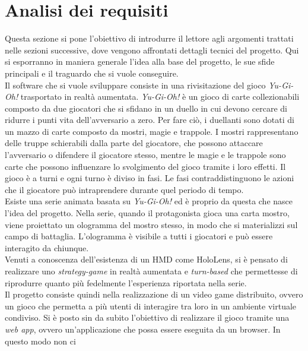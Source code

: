 \section{Analisi dei requisiti}\label{sec:Analisi}
    Questa sezione si pone l'obiettivo di introdurre il lettore agli argomenti trattati nelle sezioni successive, dove vengono affrontati dettagli tecnici del progetto. Qui si esporranno
    in maniera generale l'idea alla base del progetto, le sue sfide principali e il traguardo che si vuole conseguire.\\
    \newline
    Il software che si vuole sviluppare consiste in una rivisitazione del gioco \textit{Yu-Gi-Oh!} trasportato in realtà aumentata. \textit{Yu-Gi-Oh!} è un gioco di 
    carte collezionabili composto da due giocatori che si sfidano in un duello in cui devono cercare di ridurre i punti vita dell'avversario a zero. Per fare ciò, i duellanti sono dotati di un
    mazzo di carte composto da mostri, magie e trappole. I mostri rappresentano delle truppe schierabili dalla parte del giocatore, che possono attaccare l'avversario o difendere il
    giocatore stesso, mentre le magie e le trappole sono carte che possono influenzare lo svolgimento del gioco tramite i loro effetti. Il gioco è a turni e ogni turno è diviso in fasi. Le 
    fasi contraddistinguono le azioni che il giocatore può intraprendere durante quel periodo di tempo.\\
    \newline
    Esiste una serie animata basata su \textit{Yu-Gi-Oh!} ed è proprio da questa che nasce l'idea del progetto. Nella serie, quando il protagonista gioca una carta mostro, 
    viene proiettato un ologramma del mostro stesso, in modo che si materializzi sul campo di battaglia. L'ologramma è visibile a tutti i giocatori e può essere interagito da chiunque.\\
    Venuti a conoscenza dell'esistenza di un HMD come HoloLens, si è pensato di realizzare uno \textit{strategy-game} in realtà aumentata e \textit{turn-based} che permettesse di riprodurre 
    quanto più fedelmente l'esperienza riportata nella serie.\\
    \newline
    Il progetto consiste quindi nella realizzazione di un video game distribuito, ovvero un gioco che permetta a più utenti di interagire tra loro in un ambiente virtuale condiviso. 
    Si è posto sin da subito l'obiettivo di realizzare il gioco tramite una \textit{web app}, ovvero un'applicazione che possa essere eseguita da un browser. In questo modo non ci 
